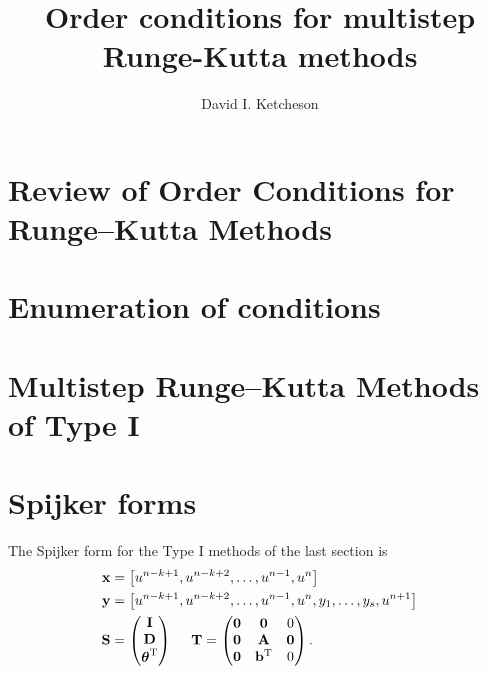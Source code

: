 \documentclass[12pt]{article}
\begin{document}
\title{Order conditions for multistep Runge-Kutta methods}
\author{David I. Ketcheson} 
\maketitle



\section{Review of Order Conditions for Runge--Kutta Methods}
  

\section{Enumeration of conditions}
  

\section{Multistep Runge--Kutta Methods of Type I}
  

\section{Spijker forms}
The Spijker form for the Type I methods of the last section is
\begin{align}
\bx & = \left[u^{n-k+1},u^{n-k+2},\dots,u^{n-1},u^n\right] \\
\by & = \left[u^{n-k+1},u^{n-k+2},\dots,u^{n-1},u^n,y_1,\dots,y_s,u^{n+1}\right] \\
\mS & = \begin{pmatrix}\mI\\\mD\\\btheta\transpose\end{pmatrix} \ \ \ \
\mT   = \begin{pmatrix}\mzero & \mzero & 0 \\ \mzero & \mA & \mzero \\ \mzero & \bb\transpose & 0 \end{pmatrix}.
\end{align}
\end{document}
